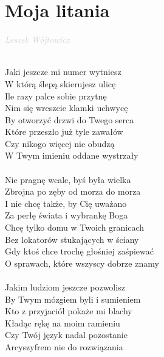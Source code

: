 \documentclass[a5paper, 10pt]{book}
\begin{document}
\newpage
\section{Moja litania}\textcolor{lightgray}{\textit{Leszek Wójtowicz}}\\~\\
\begin{minipage}[t]{0.8\textwidth}
  Jaki jeszcze mi numer wytniesz\\
  W którą ślepą skierujesz ulicę\\
  Ile razy palce sobie przytnę\\
  Nim się wreszcie klamki uchwycę\\
  By otworzyć drzwi do Twego serca\\
  Które przeszło już tyle zawałów\\
  Czy nikogo więcej nie obudzą\\
  W Twym imieniu oddane wystrzały\\
  \\
  \hspace*{5mm}Nie pragnę wcale, byś była wielka\\
  \hspace*{5mm}Zbrojna po zęby od morza do morza\\
  \hspace*{5mm}I nie chcę także, by Cię uważano\\
  \hspace*{5mm}Za perłę świata i wybrankę Boga\\
  \hspace*{5mm}Chcę tylko domu w Twoich granicach\\
  \hspace*{5mm}Bez lokatorów stukających w ściany\\
  \hspace*{5mm}Gdy ktoś chce trochę głośniej zaśpiewać\\
  \hspace*{5mm}O sprawach, które wszyscy dobrze znamy\\
  \\
  Jakim ludziom jeszcze pozwolisz\\
  By Twym mózgiem byli i sumieniem\\
  Kto z przyjaciół pokaże mi blachy\\
  Kładąc rękę na moim ramieniu\\
  Czy Twój język nadal pozostanie\\
  Arcyszyfrem nie do rozwiązania\\

\end{minipage}
\end{document}
